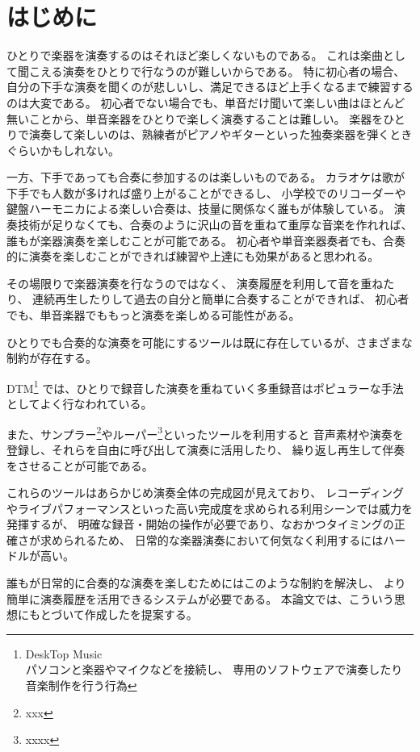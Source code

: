 %
%
\section{はじめに}
\label{sec:start}

ひとりで楽器を演奏するのはそれほど楽しくないものである。
これは楽曲として聞こえる演奏をひとりで行なうのが難しいからである。
特に初心者の場合、 自分の下手な演奏を聞くのが悲しいし、満足できるほど上手くなるまで練習するのは大変である。
初心者でない場合でも、単音だけ聞いて楽しい曲はほとんど無いことから、単音楽器をひとりで楽しく演奏することは難しい。
楽器をひとりで演奏して楽しいのは、熟練者がピアノやギターといった独奏楽器を弾くときぐらいかもしれない。

一方、下手であっても合奏に参加するのは楽しいものである。
カラオケは歌が下手でも人数が多ければ盛り上がることができるし、
小学校でのリコーダーや鍵盤ハーモニカによる楽しい合奏は、技量に関係なく誰もが体験している。
演奏技術が足りなくても、合奏のように沢山の音を重ねて重厚な音楽を作れれば、誰もが楽器演奏を楽しむことが可能である。
初心者や単音楽器奏者でも、合奏的に演奏を楽しむことができれば練習や上達にも効果があると思われる。

その場限りで楽器演奏を行なうのではなく、
演奏履歴を利用して音を重ねたり、
連続再生したりして過去の自分と簡単に合奏することができれば、
初心者でも、単音楽器でももっと演奏を楽しめる可能性がある。

ひとりでも合奏的な演奏を可能にするツールは既に存在しているが、さまざまな制約が存在する。

DTM\footnote{\textsf{DeskTop Music\\パソコンと楽器やマイクなどを接続し、
    専用のソフトウェアで演奏したり音楽制作を行う行為}}
では、ひとりで録音した演奏を重ねていく多重録音はポピュラーな手法としてよく行なわれている。\cite{jacob}\cite{resound}

また、サンプラー\footnote{xxx}やルーパー\footnote{xxxx}といったツールを利用すると
音声素材や演奏を登録し、それらを自由に呼び出して演奏に活用したり、
繰り返し再生して伴奏をさせることが可能である。

これらのツールはあらかじめ演奏全体の完成図が見えており、
レコーディングやライブパフォーマンスといった高い完成度を求められる利用シーンでは威力を発揮するが、
明確な録音・開始の操作が必要であり、なおかつタイミングの正確さが求められるため、
日常的な楽器演奏において何気なく利用するにはハードルが高い。

誰もが日常的に合奏的な演奏を楽しむためにはこのような制約を解決し、
より簡単に演奏履歴を活用できるシステムが必要である。
本論文では、こういう思想にもとづいて作成した{\system}を提案する。
